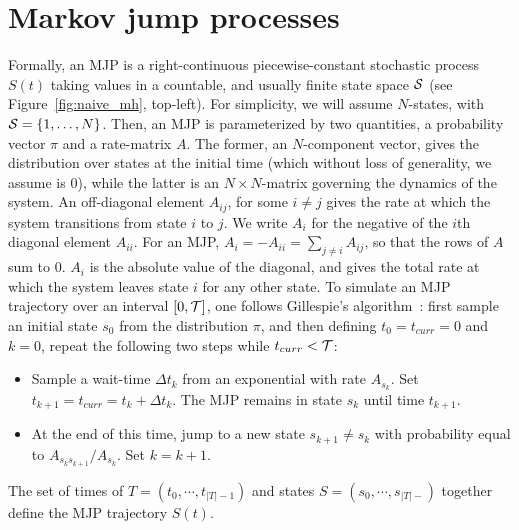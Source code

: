 \section{Markov jump processes}
Formally, an MJP is a right-continuous piecewise-constant stochastic
process $S(t)$ taking values in a countable, and usually finite state
space ${\mathcal S}$ (see Figure~\ref{fig:naive_mh}, top-left).
For simplicity, we will assume $N$-states, with ${\mathcal S} = \{1,\ldots,N\}$. Then, 
an MJP is parameterized by two quantities, a probability vector $\pi$ and a 
rate-matrix $A$. The former, an $N$-component vector, gives the 
distribution over states at the initial time (which without loss of 
generality, we assume is $0$), while the latter is an 
$N \times N$-matrix governing the dynamics of the system.  An 
off-diagonal element $A_{ij}$, for some $i \neq j$ gives the rate at 
which the system transitions from state $i$ to $j$. We write $A_i$ for the 
negative of the $i$th diagonal element $A_{ii}$. For an MJP,
$A_i = -A_{ii} = \sum_{j \neq i} A_{ij}$, so that the rows of $A$ sum to $0$.  
$A_i$ is the absolute value of the diagonal,
and gives the total rate at which the system leaves state $i$ for any other state.
To simulate an MJP trajectory over an interval $[0,{\mathcal T}]$, one follows 
Gillespie's algorithm~\cite{gillespie97}: 
first sample an initial state $s_0$ from the distribution $\pi$, and
then defining $t_0 = t_{curr} = 0$ and $k = 0$, repeat the following two steps while
$t_{curr} < {\mathcal T}$:
\begin{itemize}
  \item Sample a wait-time $\Delta t_k$ from an exponential with rate $A_{s_k}$. 
    Set $t_{k+1} = t_{curr} = t_{k} + \Delta t_k$.
    The MJP remains in state $s_k$ until time $t_{k+1}$.
  \item At the end of this time, jump to a new state $s_{k+1} \neq s_k$ with 
    probability equal to $A_{s_ks_{k+1}}/A_{s_k}$. Set $k=k+1$.
\end{itemize}
The set of times of $T=(t_0, \cdots, t_{|T| - 1})$ and states 
$S=(s_0, \cdots, s_{|T| - })$ together define the MJP trajectory $S(t)$.

